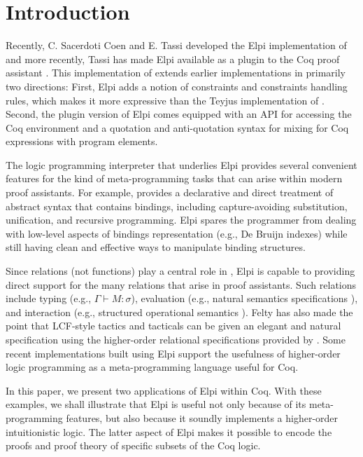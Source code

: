 \section{Introduction}
\label{sec:intro}

Recently, C. Sacerdoti Coen and E. Tassi developed the Elpi
implementation \cite{dunchev15lpar} of \lP \cite{miller12proghol} and
more recently, Tassi has made Elpi available as a plugin to the Coq
proof assistant \cite{tassi18coqpl}.  This implementation of \lP
extends earlier implementations in primarily two directions:  First,
Elpi adds a notion of constraints and constraints handling rules, which makes it more expressive than
the Teyjus implementation \cite{nadathur99cade} of \lP. Second, the
plugin version of Elpi comes equipped with an API for accessing the
Coq environment and a quotation and anti-quotation syntax for mixing
for Coq expressions with \lP program elements.

The logic programming interpreter that underlies Elpi provides several
convenient features for the kind of meta-programming tasks that can
arise within modern proof assistants.  For example, \lP provides a
declarative and direct treatment of abstract syntax that contains
bindings, including capture-avoiding substitution,
unification, and recursive programming.  Elpi spares the
programmer from dealing with low-level aspects of bindings
representation (e.g., De Bruijn indexes) while still having clean and
effective ways to manipulate binding structures.

Since relations (not functions) play a central role in \lP, Elpi is
capable to providing direct support for the many relations that arise
in proof assistants.  Such relations include typing (e.g.,
$\Gamma\vdash M\colon\sigma$), evaluation (e.g., natural semantics specifications
\cite{kahn87stacs,hannan93jfp}), and interaction (e.g., structured
operational semantics \cite{plotkin81,milner89book}).  Felty has also
made the point that LCF-style tactics and tacticals can be given an
elegant and natural specification using the higher-order relational
specifications provided by \lP \cite{felty93jar}.  Some recent
implementations built using Elpi
\cite{coen19mscs,tassi18coqpl,tassi19itp} support the usefulness of
higher-order logic programming as a meta-programming language useful
for Coq.

In this paper, we present two applications of Elpi within Coq. With
these examples, we shall illustrate that Elpi is useful not only
because of its meta-programming features,
but also because it soundly
implements a higher-order intuitionistic logic.  The latter aspect of
Elpi makes it possible to encode the proofs and proof theory of
specific subsets of the Coq logic.

